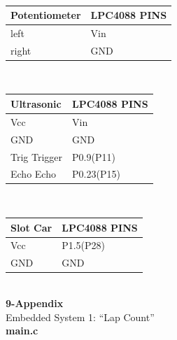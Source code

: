 \documentclass{article}
\begin{document}
\\[1in]
\begin{tabular}{| C{5cm} | C{5cm} |}
\hline
Potentiometer&LPC4088 PINS\\
\hline
left & Vin\\
\hline
right & GND\\
\hline
\end{tabular}
\\[1in]
\begin{tabular}{| C{5cm} | C{5cm} |}
\hline
Ultrasonic&LPC4088 PINS\\
\hline
Vcc & Vin\\
\hline
GND & GND\\
\hline
Trig Trigger & P0.9(P11)\\
\hline
Echo Echo & P0.23(P15)\\
\hline
\end{tabular}
\\[1in]
\begin{tabular}{| C{5cm} | C{5cm} |}
\hline
Slot Car&LPC4088 PINS\\
\hline
Vcc & P1.5(P28)\\
\hline
GND & GND\\
\hline
\end{tabular}
\\
\clearpage
{\huge\textbf {9-Appendix}}
\\
{\huge {Embedded System 1: “Lap Count”}}\\
\newline
\textbf{main.c}
\end{document}
